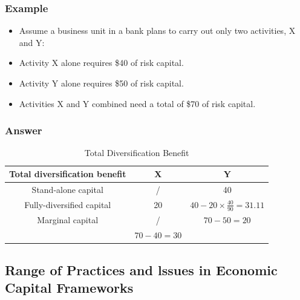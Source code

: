 \subsubsection{Example}
\begin{itemize}
\item Assume a business unit in a bank plans to carry out only two
activities, X and Y:
\item Activity X alone requires \$40 of risk capital.
\item Activity Y alone requires \$50 of risk capital.
\item Activities X and Y combined need a total of \$70 of risk
capital.
\end{itemize}


\subsubsection{Answer}

\begin{table}[h]
    \centering
    \caption{Total Diversification Benefit}
    \renewcommand{\arraystretch}{1.5} %

    \begin{tabular}{|c|c|c|}
        \hline
        \textbf{Total diversification benefit} & \textbf{X} & \textbf{Y} \\
        \hline
        Stand-alone capital & / & 40 \\
        \hline
        Fully-diversified capital & 20 & \( 40 - 20 \times \frac{40}{90} = 31.11 \) \\
        \hline
        Marginal capital & / & \( 70 - 50 = 20 \) \\
        \hline
        & \( 70 - 40 = 30 \) & \\
        \hline
    \end{tabular}
\end{table}








\subsection{Range of Practices and lssues in Economic Capital Frameworks}

